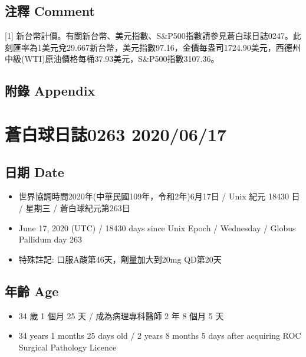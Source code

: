\documentclass[a5paper, 11pt
]{book}
\providecommand{\tightlist}{%
  \setlength{\itemsep}{0pt}\setlength{\parskip}{0pt}}
\begin{document}
\hypertarget{ux6ce8ux91cb-comment-15}{%
\subsection{注釋 Comment}\label{ux6ce8ux91cb-comment-15}}

{[}1{]}
新台幣計價。有關新台幣、美元指數、S\&P500指數請參見蒼白球日誌0247。此刻匯率為1美元兌29.667新台幣，美元指數97.16，金價每盎司1724.90美元，西德州中級(WTI)原油價格每桶37.93美元，S\&P500指數3107.36。

\hypertarget{ux9644ux9304-appendix-15}{%
\subsection{附錄 Appendix}\label{ux9644ux9304-appendix-15}}

\hypertarget{ux84bcux767dux7403ux65e5ux8a8c0263-20200617}{%
\section{蒼白球日誌0263
2020/06/17}\label{ux84bcux767dux7403ux65e5ux8a8c0263-20200617}}

\hypertarget{ux65e5ux671f-date-16}{%
\subsection{日期 Date}\label{ux65e5ux671f-date-16}}

\begin{itemize}
\tightlist
\item
  世界協調時間2020年(中華民國109年，令和2年)6月17日 / Unix 紀元 18430 日
  / 星期三 / 蒼白球紀元第263日
\item
  June 17, 2020 (UTC) / 18430 days since Unix Epoch / Wednesday / Globus
  Pallidum day 263
\item
  特殊註記: 口服A酸第46天，劑量加大到20mg QD第20天
\end{itemize}

\hypertarget{ux5e74ux9f61-age-16}{%
\subsection{年齡 Age}\label{ux5e74ux9f61-age-16}}

\begin{itemize}
\tightlist
\item
  34 歲 1 個月 25 天 / 成為病理專科醫師 2 年 8 個月 5 天
\item
  34 years 1 months 25 days old / 2 years 8 months 5 days after
  acquiring ROC Surgical Pathology Licence
\end{itemize}
\end{document}
